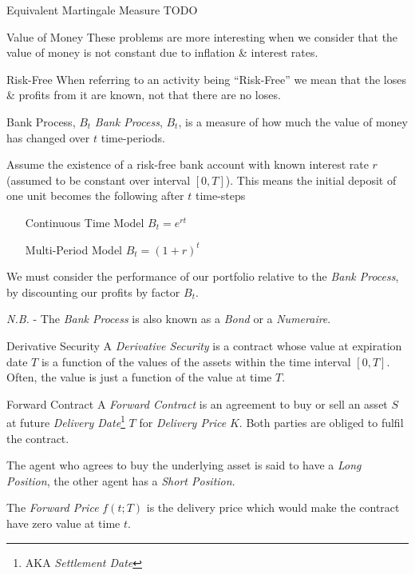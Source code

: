 \documentclass[11pt,a4paper]{article}
\begin{document}
  \begin{definition}{Equivalent Martingale Measure}
    TODO
  \end{definition}

  \begin{remark}{Value of Money}
    These problems are more interesting when we consider that the value of money is not constant due to inflation \& interest rates.
  \end{remark}

  \begin{remark}{Risk-Free}
    When referring to an activity being ``Risk-Free'' we mean that the loses \& profits from it are known, not that there are no loses.
  \end{remark}

  \begin{definition}{Bank Process, $B_t$}
    \textit{Bank Process}, $B_t$, is a measure of how much the value of money has changed over $t$ time-periods.
    \par Assume the existence of a risk-free bank account with known interest rate $r$ (assumed to be constant over interval $[0,T]$). This means the initial deposit of one unit becomes the following after $t$ time-steps
    \begin{itemize}
      \item[Continuous Time Model] $B_t=e^{rt}$
      \item[Multi-Period Model] $B_t=(1+r)^t$
    \end{itemize}
    We must consider the performance of our portfolio relative to the \textit{Bank Process}, by discounting our profits by factor $B_t$.
    \par \textit{N.B.} - The \textit{Bank Process} is also known as a \textit{Bond} or a \textit{Numeraire}.
  \end{definition}

  \begin{definition}{Derivative Security}
    A \textit{Derivative Security} is a contract whose value at expiration date $T$ is a function of the values of the assets within the time interval $[0,T]$. Often, the value is just a function of the value at time $T$.
  \end{definition}

  \begin{definition}{Forward Contract}
    A \textit{Forward Contract} is an agreement to buy or sell an asset $S$ at future \textit{Delivery Date}\footnote{AKA \textit{Settlement Date}} $T$ for \textit{Delivery Price} $K$. Both parties are obliged to fulfil the contract.
    \par The agent who agrees to buy the underlying asset is said to have a \textit{Long Position}, the other agent has a \textit{Short Position}.
    \par The \textit{Forward Price} $f(t;T)$ is the delivery price which would make the contract have zero value at time $t$.
  \end{definition}
\end{document}
